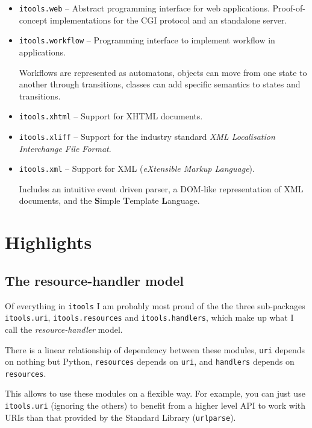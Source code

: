 \begin{itemize}
  \item {\tt itools.web} -- Abstract programming interface for web
    applications. Proof-of-concept implementations for the CGI protocol
    and an standalone server.

  \item {\tt itools.workflow} -- Programming interface to implement workflow
    in applications.

    Workflows are represented as automatons, objects can move from one state
    to another through transitions, classes can add specific semantics to
    states and transitions.

  \item {\tt itools.xhtml} -- Support for XHTML documents.

  \item {\tt itools.xliff} -- Support for the industry standard {\em XML
    Localisation Interchange File Format}.

  \item {\tt itools.xml} -- Support for XML ({\em eXtensible Markup Language}).

    Includes an intuitive event driven parser, a DOM-like representation of
    XML documents, and the {\bf S}imple {\bf T}emplate {\bf L}anguage.

\end{itemize}


\section{Highlights}

\subsection{The resource-handler model}

Of everything in {\tt itools} I am probably most proud of the the three
sub-packages {\tt itools.uri}, {\tt itools.resources} and
{\tt itools.handlers}, which make up what I call the {\em resource-handler}
model.

There is a linear relationship of dependency between these modules, {\tt uri}
depends on nothing but Python, {\tt resources} depends on {\tt uri}, and
{\tt handlers} depends on {\tt resources}.

This allows to use these modules on a flexible way. For example, you can
just use {\tt itools.uri} (ignoring the others) to benefit from a higher
level API to work with URIs than that provided by the Standard Library
({\tt urlparse}).

